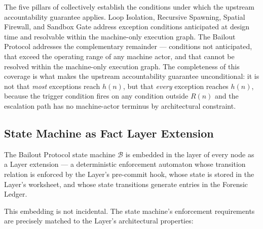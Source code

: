 The five pillars of \bxthree{} collectively establish the conditions under which the upstream accountability guarantee applies. Loop Isolation, Recursive Spawning, Spatial Firewall, and Sandbox Gate address exception conditions anticipated at design time and resolvable within the machine-only execution graph. The Bailout Protocol addresses the complementary remainder — conditions not anticipated, that exceed the operating range of any machine actor, and that cannot be resolved within the machine-only execution graph. The completeness of this coverage is what makes the upstream accountability guarantee unconditional: it is not that \emph{most} exceptions reach $h(n)$, but that \emph{every} exception reaches $h(n)$, because the trigger condition fires on any condition outside $R(n)$ and the escalation path has no machine-actor terminus by architectural constraint.

\subsection{State Machine as Fact Layer Extension}
\label{sec:state-machine-fact-layer}

The Bailout Protocol state machine $\mathcal{B}$ is embedded in the \fact{} layer of every \bxthree{} node as a \fact{} Layer extension — a deterministic enforcement automaton whose transition relation is enforced by the \fact{} Layer's pre-commit hook, whose state is stored in the \fact{} Layer's worksheet, and whose state transitions generate entries in the Forensic Ledger.

This embedding is not incidental. The state machine's enforcement requirements are precisely matched to the \fact{} Layer's architectural properties:

